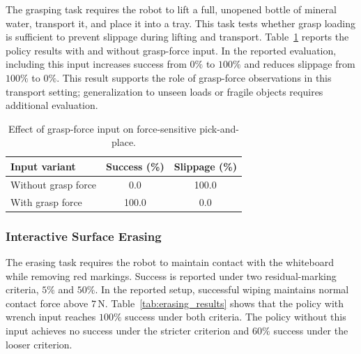 The grasping task requires the robot to lift a full, unopened bottle of mineral water, transport it, and place it into a tray.
This task tests whether grasp loading is sufficient to prevent slippage during lifting and transport.
Table~\ref{tab:grasp_results} reports the policy results with and without grasp-force input.
In the reported evaluation, including this input increases success from $0\%$ to $100\%$ and reduces slippage from $100\%$ to $0\%$.
This result supports the role of grasp-force observations in this transport setting; generalization to unseen loads or fragile objects requires additional evaluation.

\begin{table}[t]
    \centering
    \caption{Effect of grasp-force input on force-sensitive pick-and-place.}
    \label{tab:grasp_results}
    \small
    \begin{tabular}{lcc}
        \toprule
        Input variant & Success (\%) & Slippage (\%)\\
        \midrule
        Without grasp force & 0.0 & 100.0\\
        With grasp force & 100.0 & 0.0\\
        \bottomrule
    \end{tabular}
\end{table}

\subsubsection{Interactive Surface Erasing}

The erasing task requires the robot to maintain contact with the whiteboard while removing red markings.
Success is reported under two residual-marking criteria, $5\%$ and $50\%$.
In the reported setup, successful wiping maintains normal contact force above $7\,\mathrm{N}$.
Table~\ref{tab:erasing_results} shows that the policy with wrench input reaches $100\%$ success under both criteria.
The policy without this input achieves no success under the stricter criterion and $60\%$ success under the looser criterion.

